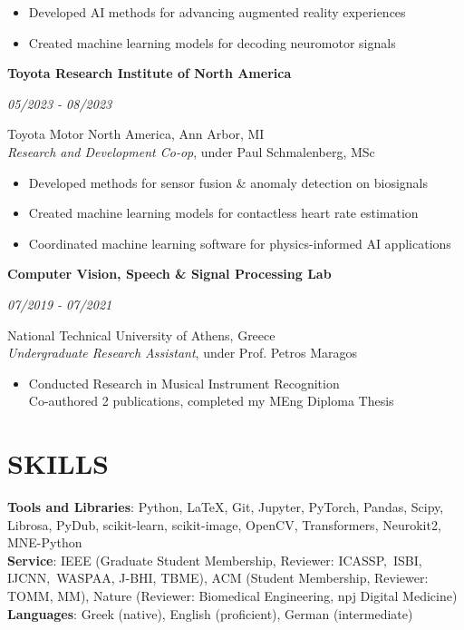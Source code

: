 \documentclass[margin]{res}
\newcommand{\cvheading}[2]{%
  \par\Needspace{4\baselineskip}\noindent
  \parbox[t]{\dimexpr\linewidth-110pt\relax}{\raggedright\bfseries #1}%
  \hfill\parbox[t]{98pt}{\raggedleft\itshape #2}%
  \par\nopagebreak[4]\vspace{-\parskip}\noindent\ignorespaces}
\begin{document}
\begin{resume}
\begin{minipage}[t]{\linewidth}
\begin{itemize}
    \item Developed AI methods for advancing augmented reality experiences
    \vspace{-1mm}
    \item Created machine learning models for decoding neuromotor signals
\end{itemize}
\end{minipage}\par
\par
\cvheading{Toyota Research Institute of North America}{05/2023 - 08/2023}
Toyota Motor North America, Ann Arbor, MI \\
\textit{Research and Development Co-op}, under Paul Schmalenberg, MSc
\vspace{1mm}
\begin{itemize}
    \item Developed methods for sensor fusion \& anomaly detection on biosignals
    \vspace{-1mm}
    \item Created machine learning models for contactless heart rate estimation
    \vspace{-1mm}
    \item Coordinated machine learning software for physics-informed AI applications
\end{itemize}
\par
\cvheading{Computer Vision, Speech \& Signal Processing Lab}{07/2019 - 07/2021}
National Technical University of Athens, Greece \\
\textit{Undergraduate Research Assistant}, under Prof. Petros Maragos
\vspace{1mm}
\begin{itemize}
    \item Conducted Research in Musical Instrument Recognition \\ Co-authored 2 publications, completed my MEng Diploma Thesis
\end{itemize}


\section{SKILLS}

\textbf{Tools and Libraries}: Python, \LaTeX, Git, Jupyter, PyTorch, Pandas, Scipy, Librosa, PyDub, scikit-learn, scikit-image, OpenCV, Transformers, Neurokit2, MNE-Python \vspace{2mm} \\
\textbf{Service}: IEEE (Graduate Student Membership, Reviewer: ICASSP,\, ISBI,\, IJCNN,\, WASPAA, J-BHI, TBME), ACM (Student Membership, Reviewer: TOMM, MM), Nature (Reviewer: Biomedical Engineering, npj Digital Medicine) \vspace{2mm} \\
\textbf{Languages}: Greek (native), English (proficient), German (intermediate)



\end{resume}
\end{document}
